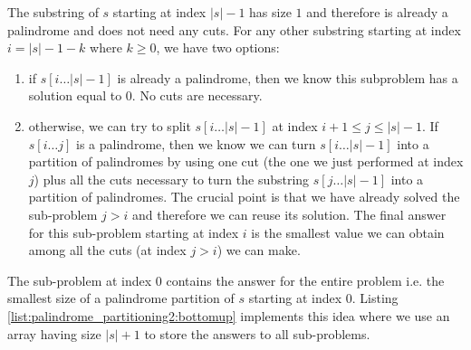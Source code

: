 The substring  of $s$ starting at index $|s|-1$ has size $1$ and therefore is already a palindrome and
does not need any cuts.
For any other substring starting at index $i = |s|-1-k$ where $k \geq 0$, we
have two options:
\begin{enumerate}
	\item if $s[i \ldots |s|-1]$ is already a palindrome, then we know this subproblem has a solution
	equal to $0$. No cuts are necessary.
	\item otherwise, we can try to split $s[i \ldots |s|-1]$  at index $i+1 \leq j \leq |s|-1$. 
	If	$s[i \ldots j]$ is a palindrome, then we know we can turn $s[i \ldots |s|-1]$ into a partition of
	palindromes by using one cut (the one we just performed at index $j$) plus all the cuts
	necessary to turn the substring $s[j \ldots |s|-1]$ into a partition of palindromes. The crucial
	point is that we have already solved the sub-problem  $j > i$ and therefore we
	can reuse its solution. The final answer for this sub-problem starting at index $i$ is the
	smallest value we can obtain among all the cuts (at index $j > i$) we can make.
\end{enumerate}
The sub-problem at index $0$ contains the answer for the entire problem i.e. the smallest size of a
palindrome partition of $s$ starting at index $0$.
Listing \ref{list:palindrome_partitioning2:bottomup} implements this idea where we use an array 
having size $|s|+1$ to store the answers to all sub-problems.

